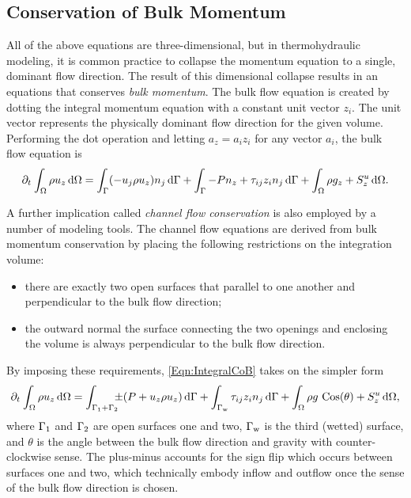 \documentclass[12pt]{../UWMadThesis}
\begin{document}
\subsection{Conservation of Bulk Momentum}

All of the above equations are three-dimensional, but in thermohydraulic modeling, it is common practice to collapse the momentum equation to a single, dominant flow direction.
The result of this dimensional collapse results in an equations that conserves \textit{bulk momentum}.
The bulk flow equation is created by dotting the integral momentum equation with a constant unit vector $z_i$.
The unit vector represents the physically dominant flow direction for the given volume.
Performing the dot operation and letting $a_z = a_i z_i$ for any vector $a_i$, the bulk flow equation is 
\begin{equation}
    \pdt \IntV \rho u_z \dV = \IntS (-u_j \rho u_z) n_j \dS + \IntS - P n_z + \tau_{ij} z_i n_j \dS + \IntV \rho g_z + S^u_z \dV.
    \label{Eqn:IntegralCoB}
\end{equation}

A further implication called \textit{channel flow conservation} is also employed by a number of modeling tools.
The channel flow equations are derived from bulk momentum conservation by placing the following restrictions on the integration volume:
\begin{itemize}
	\item{there are exactly two open surfaces that parallel to one another and perpendicular to the bulk flow direction;}
	\item{the outward normal the surface connecting the two openings and enclosing the volume is always perpendicular to the bulk flow direction.}
\end{itemize}
By imposing these requirements, \cref{Eqn:IntegralCoB} takes on the simpler form
\begin{equation}
    \pdt \IntV \rho u_z \dV =
        \int_{\S_{\text{1}} + \S_{\text{2}}}\mkern-10mu \pm(P + u_z \rho u_z)\dS + 
        \int_{\S_{\text{w}}} \tau_{ij} z_i n_j \dS + \IntV \rho g\,\Cos(\theta) + S^u_z \dV,
    \label{Eqn:IntegralCoCF}
\end{equation}
where $\S_{\text{1}}$ and $\S_{\text{2}}$ are open surfaces one and two, $\S_{\text{w}}$ is the third (wetted) surface, and $\theta$ is the angle between the bulk flow direction and gravity with counter-clockwise sense.
The plus-minus accounts for the sign flip which occurs between surfaces one and two, which technically embody inflow and outflow once the sense of the bulk flow direction is chosen.
\end{document}
